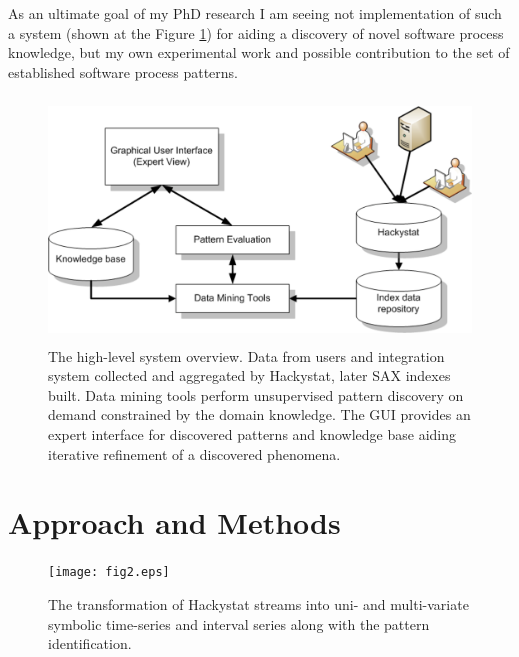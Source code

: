 \documentclass[11pt,oneside]{article}
\begin{document}
As an ultimate goal of my PhD research I am seeing not implementation of such a system (shown at the Figure \ref{fig:system_overview}) for aiding a discovery of novel software process knowledge, but my own experimental work and possible contribution to the set of established software process patterns.

\begin{figure}[tbp]
   \centering
   \includegraphics[height=65mm]{system_overview.eps}
   \caption{The high-level system overview. Data from users and integration system collected and aggregated by Hackystat, later SAX indexes built. Data mining tools perform unsupervised pattern discovery on demand constrained by the domain knowledge. The GUI provides an expert interface for discovered patterns and knowledge base aiding iterative refinement of a discovered phenomena.}
   \label{fig:system_overview}
\end{figure}


\section{Approach and Methods}

\begin{figure}[tbp]
   \centering
   \texttt{[image: fig2.eps]}
   \caption{The transformation of Hackystat streams into uni- and multi-variate symbolic time-series and interval series along with the pattern identification.}
   \label{fig:fig2}
\end{figure}
\end{document}
